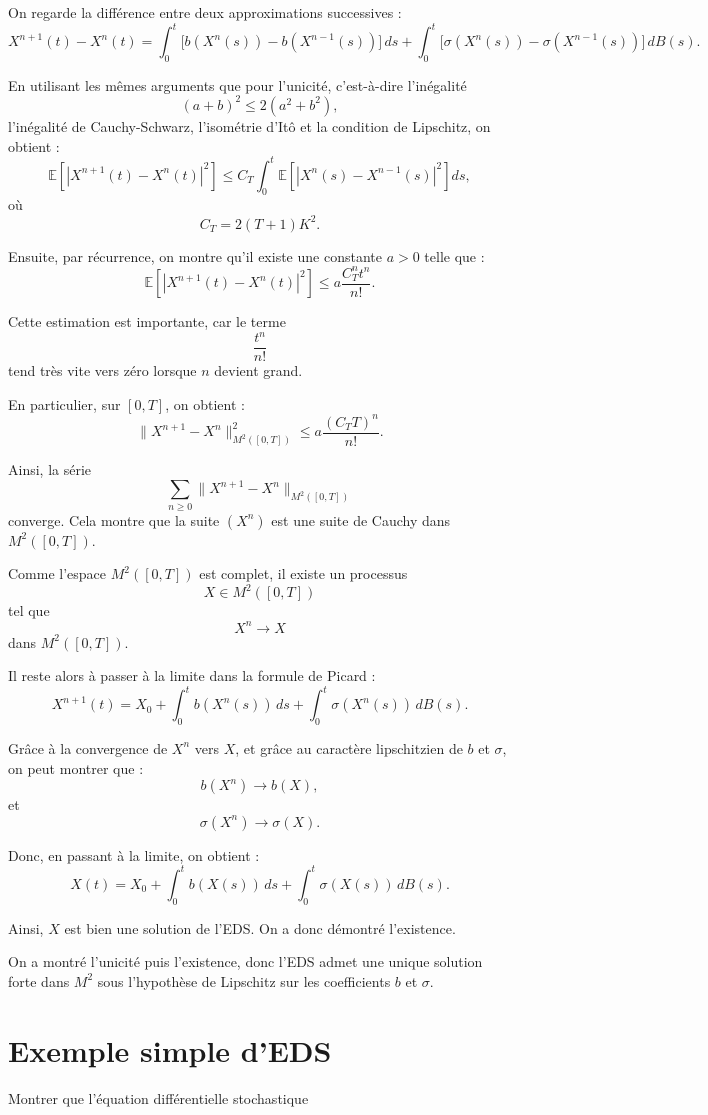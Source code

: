 \documentclass[12pt,a4paper]{article}
\theoremstyle{remark}
\begin{document}
On regarde la différence entre deux approximations successives :
\[
X^{n+1}(t)-X^n(t)
=
\int_0^t
\bigl[
b(X^n(s))-b(X^{n-1}(s))
\bigr]\,ds
+
\int_0^t
\bigl[
\sigma(X^n(s))-\sigma(X^{n-1}(s))
\bigr]\,dB(s).
\]

En utilisant les mêmes arguments que pour l’unicité, c’est-à-dire l’inégalité
\[
(a+b)^2 \leq 2(a^2+b^2),
\]
l’inégalité de Cauchy-Schwarz, l’isométrie d’Itô et la condition de Lipschitz, on obtient :
\[
\mathbb{E}\left[
|X^{n+1}(t)-X^n(t)|^2
\right]
\leq
C_T
\int_0^t
\mathbb{E}\left[
|X^n(s)-X^{n-1}(s)|^2
\right]ds,
\]
où
\[
C_T=2(T+1)K^2.
\]

Ensuite, par récurrence, on montre qu’il existe une constante $a>0$ telle que :
\[
\mathbb{E}\left[
|X^{n+1}(t)-X^n(t)|^2
\right]
\leq
a\frac{C_T^n t^n}{n!}.
\]

Cette estimation est importante, car le terme
\[
\frac{t^n}{n!}
\]
tend très vite vers zéro lorsque $n$ devient grand.

En particulier, sur $[0,T]$, on obtient :
\[
\|X^{n+1}-X^n\|_{M^2([0,T])}^2
\leq
a\frac{(C_TT)^n}{n!}.
\]

Ainsi, la série
\[
\sum_{n \geq 0}
\|X^{n+1}-X^n\|_{M^2([0,T])}
\]
converge. Cela montre que la suite $(X^n)$ est une suite de Cauchy dans $M^2([0,T])$.

Comme l’espace $M^2([0,T])$ est complet, il existe un processus
\[
X \in M^2([0,T])
\]
tel que
\[
X^n \longrightarrow X
\]
dans $M^2([0,T])$.

Il reste alors à passer à la limite dans la formule de Picard :
\[
X^{n+1}(t)
=
X_0
+
\int_0^t b(X^n(s))\,ds
+
\int_0^t \sigma(X^n(s))\,dB(s).
\]

Grâce à la convergence de $X^n$ vers $X$, et grâce au caractère lipschitzien de $b$ et $\sigma$, on peut montrer que :
\[
b(X^n) \longrightarrow b(X),
\]
et
\[
\sigma(X^n) \longrightarrow \sigma(X).
\]

Donc, en passant à la limite, on obtient :
\[
X(t)
=
X_0
+
\int_0^t b(X(s))\,ds
+
\int_0^t \sigma(X(s))\,dB(s).
\]

Ainsi, $X$ est bien une solution de l’EDS. On a donc démontré l’existence.


On a montré l’unicité puis l’existence, donc l’EDS admet une unique solution forte dans $M^2$ sous l’hypothèse de Lipschitz sur les coefficients $b$ et $\sigma$.


\section{Exemple simple d’EDS}
Montrer que l'équation différentielle stochastique
\end{document}

